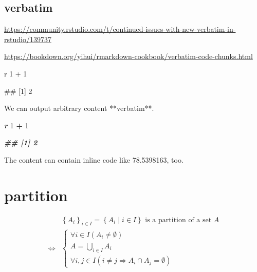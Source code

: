 \documentclass[
]{book}
\newenvironment{Shaded}{\begin{snugshade}}{\end{snugshade}}
\newcommand{\DecValTok}[1]{\textcolor[rgb]{0.00,0.00,0.81}{#1}}
\newcommand{\InformationTok}[1]{\textcolor[rgb]{0.56,0.35,0.01}{\textbf{\textit{#1}}}}
\newcommand{\NormalTok}[1]{#1}
\newcommand{\SpecialCharTok}[1]{\textcolor[rgb]{0.81,0.36,0.00}{\textbf{#1}}}
\theoremstyle{definition}
\theoremstyle{definition}
\theoremstyle{definition}
\theoremstyle{definition}
\theoremstyle{remark}
\begin{document}
\section{verbatim}\label{verbatim}

\url{https://community.rstudio.com/t/continued-issues-with-new-verbatim-in-rstudio/139737}

\url{https://bookdown.org/yihui/rmarkdown-cookbook/verbatim-code-chunks.html}

\begin{Shaded}
\begin{Highlighting}[]


\NormalTok{\textasciigrave{}\textasciigrave{}\textasciigrave{}r}
\NormalTok{1 + 1}
\NormalTok{\textasciigrave{}\textasciigrave{}\textasciigrave{}}

\NormalTok{\textasciigrave{}\textasciigrave{}\textasciigrave{}}
\NormalTok{\#\# [1] 2}
\NormalTok{\textasciigrave{}\textasciigrave{}\textasciigrave{}}
\end{Highlighting}
\end{Shaded}

\begin{Shaded}
\begin{Highlighting}[]
\NormalTok{We can output arbitrary content **verbatim**.}


\InformationTok{\textasciigrave{}\textasciigrave{}\textasciigrave{}r}
\DecValTok{1} \SpecialCharTok{+} \DecValTok{1}
\InformationTok{\textasciigrave{}\textasciigrave{}\textasciigrave{}}

\InformationTok{\textasciigrave{}\textasciigrave{}\textasciigrave{}}
\InformationTok{\#\# [1] 2}
\InformationTok{\textasciigrave{}\textasciigrave{}\textasciigrave{}}

\NormalTok{The content can contain inline code like}
\NormalTok{78.5398163, too.}
\end{Highlighting}
\end{Shaded}

\chapter{partition}\label{partition}

\begin{align*}
 & \left\{ A_{i}\right\} _{i\in I}=\left\{ A_{i}\middle|i\in I\right\} \text{ is a partition of a set }A\\
\Leftrightarrow & \begin{cases}
\forall i\in I\left(A_{i}\ne\emptyset\right)\\
A=\bigcup\limits _{i\in I}A_{i}\\
\forall i,j\in I\left(i\ne j\Rightarrow A_{i}\cap A_{j}=\emptyset\right)
\end{cases}
\end{align*}
\end{document}
